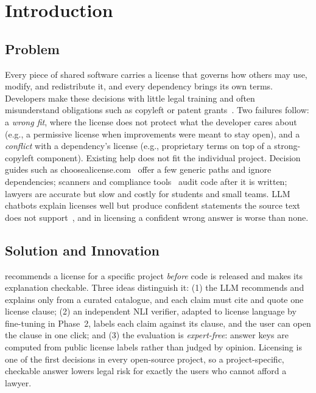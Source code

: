 \section{Introduction}
\label{s:intro}

\subsection{Problem}
Every piece of shared software carries a license that governs how others may use, modify, and redistribute it, and every dependency brings its own terms. Developers make these decisions with little legal training and often misunderstand obligations such as copyleft or patent grants~\cite{almeida2017developers,wu2024license}. Two failures follow: a \emph{wrong fit}, where the license does not protect what the developer cares about (e.g., a permissive license when improvements were meant to stay open), and a \emph{conflict} with a dependency's license (e.g., proprietary terms on top of a strong-copyleft component). Existing help does not fit the individual project. Decision guides such as choosealicense.com~\cite{choosealicense} offer a few generic paths and ignore dependencies; scanners and compliance tools~\cite{german2010ninka,scancode,xu2023lidetector} audit code after it is written; lawyers are accurate but slow and costly for students and small teams. LLM chatbots explain licenses well but produce confident statements the source text does not support~\cite{ji2023hallucination,maynez2020faithfulness}, and in licensing a confident wrong answer is worse than none.

\subsection{Solution and Innovation}
\sys{} recommends a license for a specific project \emph{before} code is released and makes its explanation checkable. Three ideas distinguish it: (1) the LLM recommends and explains only from a curated catalogue, and each claim must cite and quote one license clause; (2) an independent NLI verifier, adapted to license language by fine-tuning in Phase~2, labels each claim against its clause, and the user can open the clause in one click; and (3) the evaluation is \emph{expert-free}: answer keys are computed from public license labels rather than judged by opinion. Licensing is one of the first decisions in every open-source project, so a project-specific, checkable answer lowers legal risk for exactly the users who cannot afford a lawyer.

